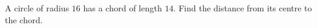 A circle of radius $ 16 $ has a chord of length $ 14 $. Find the distance from its centre to the chord.
